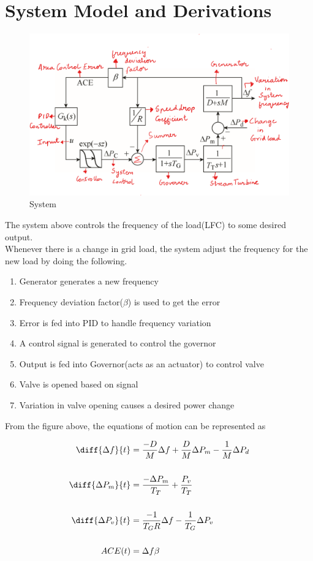 \documentclass[journal]{IEEEtran}
\begin{document}
\section{System Model and Derivations}

\begin{figure}
\includegraphics[width=\linewidth]{systemmodel.png}
  \caption{System}
  \label{fig:System1}
\end{figure}


The system above controls the frequency of the load(LFC) to some desired output. \\

Whenever there is a change in grid load, the system adjust the frequency for the new load by 
doing the following.

\begin{enumerate} 
  \item Generator generates a new frequency 
  \item Frequency deviation factor($\beta$) is used to get the error
  \item Error is fed into PID to handle frequency variation
  \item A control signal is generated to control the governor
  \item Output is fed into Governor(acts as an actuator) to control valve
  \item Valve is opened based on signal
  \item Variation in valve opening causes a desired power change  
 \end{enumerate}
From the figure above, the equations of motion can be represented as 


\begin{align}
  \diff{\Delta f}{t} &= \frac{-D}{M}\Delta f + \frac{D}{M}\Delta P_m - \frac{1}{M}\Delta{P_d} \\ \\
  \diff{\Delta P_m}{t} &= \frac{-\Delta P_m}{T_T} + \frac{P_v}{T_T} \\ \\
  \diff{\Delta P_v}{t} &= \frac{-1}{T_GR}{\Delta f} - \frac{1}{T_G}{\Delta P_v}  \\ \\
  ACE(t) &= \Delta f \beta
\end{align} \\
\end{document}
